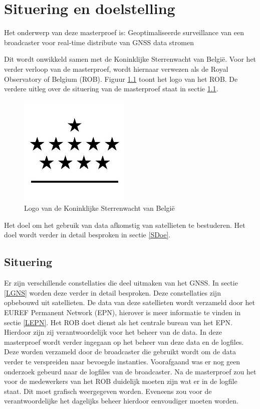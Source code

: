 \newcommand*{\MyIndentSit}{\hspace*{1 cm}}%

\chapter{Situering en doelstelling}
\label{Situering}
Het onderwerp van deze masterproef is: \newline
\MyIndentSit Geoptimaliseerde surveillance van een broadcaster voor real-time distribute van GNSS data stromen


Dit wordt onwikkeld samen met de Koninklijke Sterrenwacht van Belgi\"e. Voor het verder verloop van de masterproef, wordt hiernaar verwezen als de Royal Observatory of Belgium (ROB). Figuur \ref{imgROB} toont het logo van het ROB. De verdere uitleg over de situering van de masterproef staat in sectie \ref{SSit}.

\begin{figure}[hpb]
	\includegraphics[scale=1]{ROB.jpg}
	\caption{Logo van de Koninklijke Sterrenwacht van Belgi\"e \cite{SImgROB}}
	\label{imgROB}
\end{figure} 

Het doel om het gebruik van data afkomstig van satellieten te bestuderen. Het doel wordt verder in detail besproken in sectie \ref{SDoe}.

\section{Situering}
\label{SSit}
Er zijn verschillende constellaties die deel uitmaken van het GNSS. In sectie \ref{LGNS} worden deze verder in detail besproken. Deze constellaties zijn opbebouwd uit satellieten. De data van deze satellieten wordt verzameld door het EUREF Permanent Network (EPN), hierover is meer informatie te vinden in sectie \ref{LEPN}. Het ROB doet dienst als het centrale bureau van het EPN. Hierdoor zijn zij verantwoordelijk voor het beheer van de data. In deze masterproef wordt verder ingegaan op het beheer van deze data en de logfiles. Deze worden verzameld door de broadcaster die gebruikt wordt om de data verder te verspreiden naar bevoegde instanties. Voorafgaand was er nog geen onderzoek gebeurd naar de logfiles van de broadcaster. Na de masterproef zou het voor de medewerkers van het ROB duidelijk moeten zijn wat er in de logfile staat. Dit moet grafisch weergegeven worden. Eveneens zou voor de verantwoordelijke het dagelijks beheer hierdoor eenvoudiger moeten worden. 

